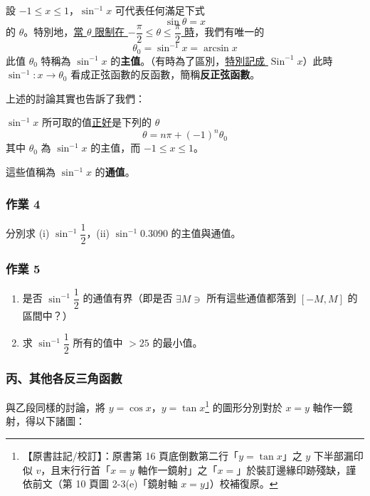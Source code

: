 \medskip
\begin{definition*}
設 $-1 \le x \le 1$，$\sin^{-1} x$ 可代表任何滿足下式
\[
\sin \theta = x
\]
的 $\theta$。特別地，\underline{當 $\theta$ 限制在 $-\dfrac{\pi}{2} \le \theta \le \dfrac{\pi}{2}$ 時}，我們有唯一的
\[
\theta_0 = \sin^{-1} x = \arcsin x
\]
此值 $\theta_0$ 特稱為 $\sin^{-1} x$ 的\textbf{主值}。（有時為了區別，\underline{特別記成 $\operatorname{Sin}^{-1} x$}）此時 $\sin^{-1} : x \longrightarrow \theta_0$ 看成正弦函數的反函數，簡稱\quad \textbf{反正弦函數}。
\end{definition*}

上述的討論其實也告訴了我們：

\medskip
\begin{prop}\label{prop:b5-1-1}
$\sin^{-1} x$ 所可取的值\underline{正好}是下列的 $\theta$
\[
\theta = n\pi + (-1)^n \theta_0
\]
其中 $\theta_0$ 為 $\sin^{-1} x$ 的主值，而 $-1 \le x \le 1$。
\end{prop}
這些值稱為 $\sin^{-1} x$ 的\textbf{通值}。

\medskip
\subsubsection*{作業 4}
分別求 (i) $\sin^{-1} \dfrac{1}{2}$，(ii) $\sin^{-1} 0.3090$ 的主值與通值。

\medskip
\subsubsection*{作業 5}
\begin{enumerate}[label=(\roman*), topsep=2pt, itemsep=2pt]
  \item 是否 $\sin^{-1} \dfrac{1}{2}$ 的通值有界（即是否 $\exists M \ni$ 所有這些通值都落到 $[-M, M]$ 的區間中？）
  \item 求 $\sin^{-1} \dfrac{1}{2}$ 所有的值中 $> 25$ 的最小值。
\end{enumerate}

\subsubsection*{丙、其他各反三角函數}

與乙段同樣的討論，將 $y = \cos x$，$y = \tan x$\label{note:b5-ch1-p16bottom}\footnote{【原書註記/校訂】：原書第 16 頁底倒數第二行「$y = \tan x$」之 $y$ 下半部漏印似 $v$，且末行行首「$x = y$ 軸作一鏡射」之「$x =$」於裝訂邊緣印跡殘缺，謹依前文（第 10 頁圖 2-3(e)「鏡射軸 $x = y$」）校補復原。} 的圖形分別對於 $x = y$ 軸作一鏡射，得以下諸圖：

